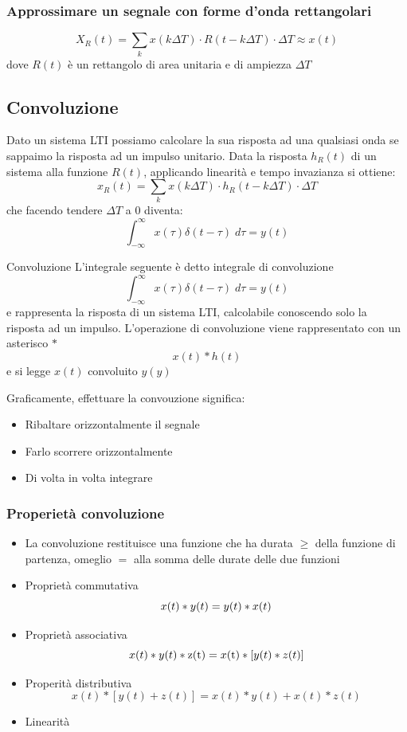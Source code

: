 \subsubsection*{Approssimare un segnale con forme d'onda rettangolari}
\[
	X_R\left(t\right) = \sum_{k} x\left(k \Delta T\right) \cdot R\left(t - k  \Delta T\right) \cdot  \Delta T \approx x\left(t\right)
\]
dove $ R\left(t\right) $ è un rettangolo di area unitaria e di ampiezza $ \Delta T $
\subsection{Convoluzione}
Dato un sistema  LTI possiamo calcolare la sua risposta ad una qualsiasi onda se sappaimo la risposta ad un impulso unitario. Data la risposta $ h_R\left(t\right) $ di un sistema alla funzione $ R\left(t\right) $, applicando linearità e tempo invazianza si ottiene:
\[
	x_R\left(t\right) = \sum_{k} x\left(k \Delta T\right) \cdot h_R\left(t - k  \Delta T\right) \cdot  \Delta T
\]
che facendo tendere $ \Delta T $ a 0 diventa:
\[
	\int_{-\infty }^{\infty } x\left(\tau \right) \delta \left(t-\tau \right)  \; d \tau = y\left(t\right)
\]

\begin{definizione}{Convoluzione}
	L'integrale seguente è detto integrale di convoluzione
	\[
		\int_{-\infty }^{\infty } x\left(\tau \right) \delta \left(t-\tau \right)  \; d \tau = y\left(t\right)
	\]
	e rappresenta la risposta di un sistema LTI, calcolabile conoscendo solo la risposta ad un impulso. L'operazione di convoluzione viene rappresentato con un asterisco $ * $
	\[
		x\left(t\right) * h\left(t\right)
	\]
	e si legge $ x\left(t\right) $ convoluito $ y\left(y\right) $
\end{definizione}
Graficamente, effettuare la convouzione significa:
\begin{itemize}
	\item Ribaltare orizzontalmente il segnale
	\item Farlo scorrere orizzontalmente
	\item Di volta in volta integrare
\end{itemize}
\subsubsection*{Properietà convoluzione}
\begin{itemize}
	\item La convoluzione restituisce una funzione che ha durata $ \ge  $ della funzione di partenza, omeglio $ =  $ alla somma delle durate delle due funzioni
	\item Proprietà commutativa
	      \[
		      x(t) * y(t)=y(t) * x(t) \\
	      \]
	\item Proprietà associativa
	      \[
		      x(t) * y(t) * \mathrm{z}(\mathrm{t})=x(\mathrm{t}) *[y(t) * z(t)] \\
	      \]
	\item Properità distributiva
	      \[
		      x(t) *[y(t)+z(t)]=x(t) * y(t)+x(t) * z(t)
	      \]
	\item Linearità
	      \[
	      \]
\end{itemize}
